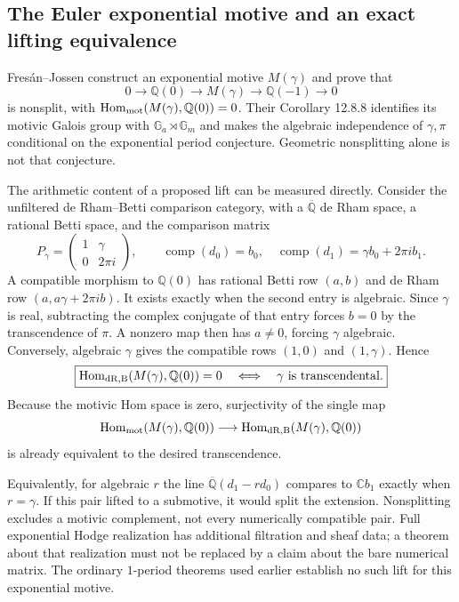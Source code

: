 \documentclass[11pt,a4paper]{article}
\theoremstyle{definition}
\theoremstyle{remark}
\numberwithin{equation}{section}
\begin{document}
\subsection{The Euler exponential motive and an exact lifting equivalence}
\label{gamma-motive}

Fres\'an--Jossen construct an exponential motive $M(\gamma)$ and prove
\cite[Proposition 12.8.7]{gamma-FresanJossen} that
\[
 0\longrightarrow\mathbb Q(0)\longrightarrow M(\gamma)
 \longrightarrow\mathbb Q(-1)\longrightarrow0
\]
is nonsplit, with
$\operatorname{Hom}_{\rm mot}(M(\gamma),\mathbb Q(0))=0$.
Their Corollary 12.8.8 identifies its motivic Galois group with
$\mathbb G_a\rtimes\mathbb G_m$ and makes the algebraic independence
of $\gamma,\pi$ conditional on the exponential period conjecture.
Geometric nonsplitting alone is not that conjecture.

The arithmetic content of a proposed lift can be measured directly.
Consider the unfiltered de Rham--Betti comparison category, with a
$\overline{\mathbb Q}$ de Rham space, a rational Betti space, and the
comparison matrix
\[
 P_\gamma=\begin{pmatrix}1&\gamma\\0&2\pi i\end{pmatrix},
 \qquad\operatorname{comp}(d_0)=b_0,\quad
 \operatorname{comp}(d_1)=\gamma b_0+2\pi i b_1.
\]
A compatible morphism to $\mathbb Q(0)$ has rational Betti row
$(a,b)$ and de Rham row $(a,a\gamma+2\pi i b)$. It exists exactly
when the second entry is algebraic. Since $\gamma$ is real, subtracting
the complex conjugate of that entry forces $b=0$ by the transcendence
of $\pi$. A nonzero map then has $a\ne0$, forcing $\gamma$ algebraic.
Conversely, algebraic $\gamma$ gives the compatible rows $(1,0)$ and
$(1,\gamma)$. Hence
\begin{equation}
 \boxed{\operatorname{Hom}_{\rm dR,B}
 (M(\gamma),\mathbb Q(0))=0
 \quad\Longleftrightarrow\quad\gamma\text{ is transcendental}.}
 \label{gamma-DB-equivalence}
\end{equation}
Because the motivic Hom space is zero, surjectivity of the single map
\[
 \operatorname{Hom}_{\rm mot}(M(\gamma),\mathbb Q(0))
 \longrightarrow
 \operatorname{Hom}_{\rm dR,B}(M(\gamma),\mathbb Q(0))
\]
is already equivalent to the desired transcendence.

Equivalently, for algebraic $r$ the line
$\overline{\mathbb Q}(d_1-rd_0)$ compares to $\mathbb Cb_1$ exactly
when $r=\gamma$. If this pair lifted to a submotive, it would split
the extension. Nonsplitting excludes a motivic complement, not every
numerically compatible pair. Full exponential Hodge realization has
additional filtration and sheaf data; a theorem about that realization
must not be replaced by a claim about the bare numerical matrix. The
ordinary $1$-period theorems used earlier establish no such lift for
this exponential motive.
\end{document}
